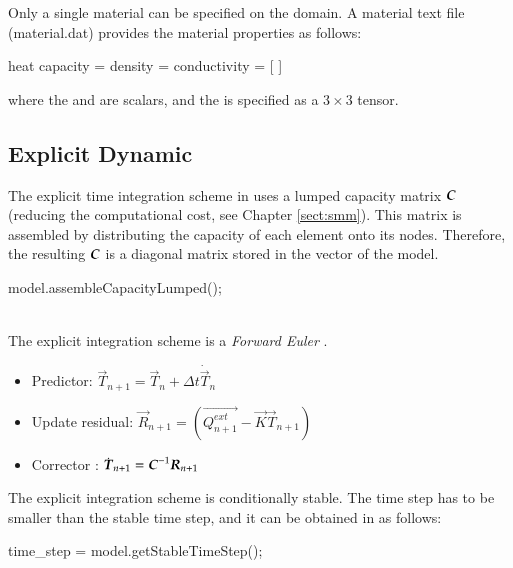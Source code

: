Only a single material can be specified on the domain. 
A material text file (\eg material.dat) provides the material properties as follows:
\begin{cpp}
  heat %
  capacity = %
  density = %
  conductivity = [%
  ]
\end{cpp}
where the  and  are scalars, and the  is specified as a $3\times 3$ tensor.

\subsection{Explicit Dynamic}

The explicit  time integration scheme in \akantu  uses a lumped capacity
matrix $\boldsymbol{C}$ (reducing the computational  cost, see Chapter \ref{sect:smm}). 
This matrix is assembled by
distributing the capacity of each element onto its nodes. Therefore, the resulting $\boldsymbol{C}$ is a diagonal matrix stored in the  vector of the model.

\begin{cpp}
  model.assembleCapacityLumped();
\end{cpp}

 \\

The explicit integration scheme is a  {\it Forward Euler} 
\cite{curnier92a}.

\begin{itemize}
\item Predictor: $\vec{T}_{n+1} = \vec{T}_{n} + \Delta t \dot{\vec{T}}_{n}$
\item Update residual: $\vec{R}_{n+1} = \left( \vec{Q^{ext}_{n+1}} - \vec{K}\vec{T}_{n+1} \right)$
\item Corrector : $\dot{\boldsymbol{T}}_{n+1} = \boldsymbol{C}^{-1} \boldsymbol{R}_{n+1}$
\end{itemize}

The explicit integration scheme is conditionally stable. The time step has to be smaller than the stable time step, 
and it can be obtained in \akantu as follows:

\begin{cpp}
  time_step = model.getStableTimeStep();
\end{cpp}

